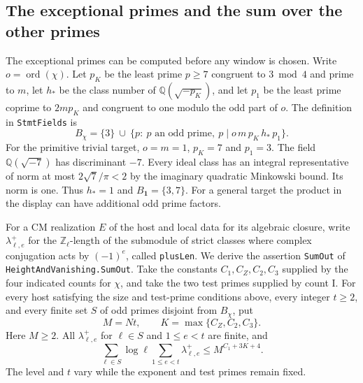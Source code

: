 \subsection{The exceptional primes and the sum over the other primes}

The exceptional primes can be computed before any window is chosen.
Write \(o=\operatorname{ord}(\chi)\). Let \(p_K\) be the least prime
\(p\ge7\) congruent to \(3\bmod4\) and prime to \(m\), let
\(h_*\) be the class number of \(\mathbb Q(\sqrt{-p_K})\), and
let \(p_1\) be the least prime coprime to \(2mp_K\) and congruent
to one modulo the odd part of \(o\). The definition in \texttt{Stmt\allowbreak{}Fields}
is
\[
 B_\chi=\{3\}\ \cup\
 \{p:\ p\text{ an odd prime},\ p\mid o\,m\,p_K\,h_*\,p_1\}.
\]
For the primitive trivial target, \(o=m=1\), \(p_K=7\) and \(p_1=3\).
The field \(\mathbb Q(\sqrt{-7})\) has discriminant \(-7\).
Every ideal class has an integral representative of norm at most
\(2\sqrt7/\pi<2\) by the imaginary quadratic Minkowski bound.
Its norm is one. Thus \(h_*=1\) and \(B_{\mathbf1}=\{3,7\}\).
For a general target the product in the display can have additional
odd prime factors.

For a CM realization \(E\) of the host and local data for its
algebraic closure, write \(\lambda^+_{\ell,e}\) for the
\(\mathbb Z_\ell\)-length of the submodule of strict classes
where complex conjugation acts by \((-1)^e\), called
\texttt{plus\allowbreak{}Len}. We derive the assertion
\texttt{Sum\allowbreak{}Out} of \texttt{Height\allowbreak{}And\allowbreak{}Vanishing.\allowbreak{}Sum\allowbreak{}Out}. Take the
constants \(C_1,C_Z,C_2,C_3\) supplied by the four indicated
counts for \(\chi\), and take the two test primes supplied by count I.
For every host satisfying the size and test-prime conditions above,
every integer \(t\ge2\), and every finite set \(S\) of odd primes
disjoint from \(B_\chi\), put
\[
        M=Nt,\qquad K=\max\{C_Z,C_2,C_3\}.
\]
Here \(M\ge2\). All \(\lambda^+_{\ell,e}\) for \(\ell\in S\) and
\(1\le e<t\) are finite, and
\begin{equation}
 \sum_{\ell\in S}\log\ell\sum_{1\le e<t}\lambda^+_{\ell,e}
       \le M^{C_1+3K+4}.
 \label{eq:rh-arith-sumout}
\end{equation}
The level and \(t\) vary while the exponent and test primes remain fixed.

